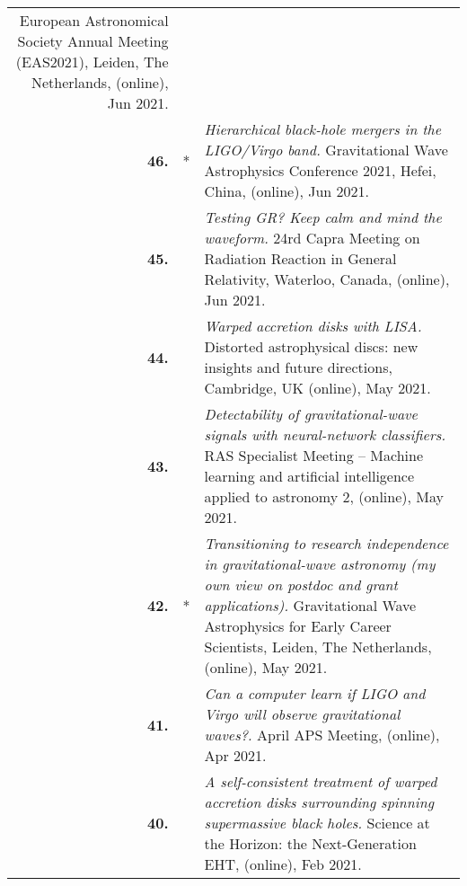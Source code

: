 {\begin{longtable}{rp{0.3cm}p{15.8cm}}
\newline{}
European Astronomical Society Annual Meeting (EAS2021), Leiden, The Netherlands, (online), Jun 2021.
\vspace{0.05cm}\\
%
\textbf{46.} & * & \textit{Hierarchical black-hole mergers in the LIGO/Virgo band.}
\newline{}
Gravitational Wave Astrophysics Conference 2021, Hefei, China, (online), Jun 2021.
\vspace{0.05cm}\\
%
\textbf{45.} &  & \textit{Testing GR? Keep calm and mind the waveform.}
\newline{}
24rd Capra Meeting on Radiation Reaction in General Relativity, Waterloo, Canada, (online), Jun 2021.
\vspace{0.05cm}\\
%
\textbf{44.} &  & \textit{Warped accretion disks with LISA.}
\newline{}
Distorted astrophysical discs: new insights and future directions, Cambridge, UK (online), May 2021.
\vspace{0.05cm}\\
%
\textbf{43.} &  & \textit{Detectability of gravitational-wave signals with neural-network classifiers.}
\newline{}
RAS Specialist Meeting -- Machine learning and artificial intelligence applied to astronomy 2, (online), May 2021.
\vspace{0.05cm}\\
%
\textbf{42.} & * & \textit{Transitioning to research independence in gravitational-wave astronomy (my own view on postdoc and grant applications).}
\newline{}
Gravitational Wave Astrophysics for Early Career Scientists, Leiden, The Netherlands, (online), May 2021.
\vspace{0.05cm}\\
%
\textbf{41.} &  & \textit{Can a computer learn if LIGO and Virgo will observe gravitational waves?.}
\newline{}
April APS Meeting, (online), Apr 2021.
\vspace{0.05cm}\\
%
\textbf{40.} &  & \textit{A self-consistent treatment of warped accretion disks surrounding spinning supermassive black holes.}
\newline{}
Science at the Horizon: the Next-Generation EHT, (online), Feb 2021.
\vspace{0.05cm}\\

\end{longtable}}

